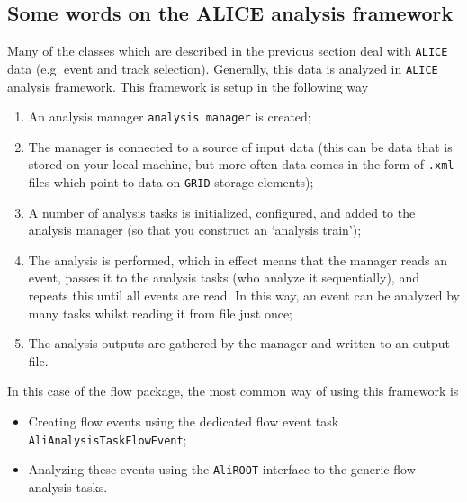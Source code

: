 \documentclass[a4paper]{book}
\numberwithin{equation}{subsection}
\begin{document}
\subsection{Some words on the ALICE analysis framework}
Many of the classes which are described in the previous section deal with \texttt{ALICE} data (e.g. event and track selection). Generally, this data is analyzed in \texttt{ALICE} analysis framework. This framework is setup in the following way
\begin{enumerate}
\item An analysis manager \texttt{analysis manager} is created; 
\item The manager is connected to a source of input data (this can be data that is stored on your local machine, but more often data comes in the form of \texttt{.xml} files which point to data on \texttt{GRID} storage elements);
\item A number of analysis tasks is initialized, configured, and added to the analysis manager (so that you construct an `analysis train');
\item The analysis is performed, which in effect means that the manager reads an event, passes it to the analysis tasks (who analyze it sequentially), and repeats this until all events are read. In this way, an event can be analyzed by many tasks whilst reading it from file just once;
\item The analysis outputs are gathered by the manager and written to an output file.
\end{enumerate}
In this case of the flow package, the most common way of using this framework is 
\begin{itemize}
\item Creating flow events using the dedicated flow event task \texttt{AliAnalysisTaskFlowEvent};
\item Analyzing these events using the \texttt{AliROOT} interface to the generic flow analysis tasks. 
\end{itemize}
\end{document}
